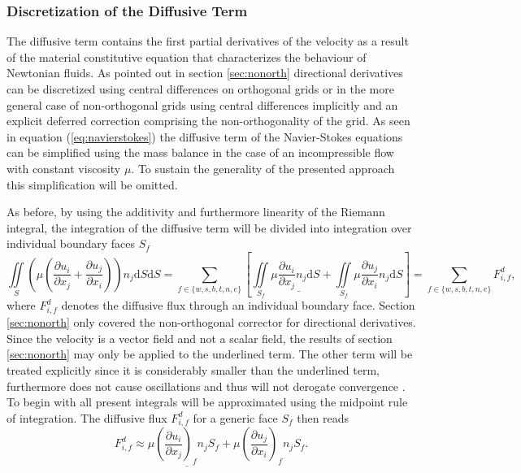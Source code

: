       \subsubsection{Discretization of the Diffusive Term}

      The diffusive term contains the first partial derivatives of the velocity as a result of the material constitutive equation that characterizes the behaviour of Newtonian fluids. As pointed out in section \ref{sec:nonorth} directional derivatives can be discretized using central differences on orthogonal grids or in the more general case of non-orthogonal grids using central differences implicitly and an explicit deferred correction comprising the non-orthogonality of the grid. As seen in equation (\ref{eq:navierstokes}) the diffusive term of the Navier-Stokes equations can be simplified using the mass balance in the case of an incompressible flow with constant viscosity \(\mu\). To sustain the generality of the presented approach this simplification will be omitted.

      As before, by using the additivity and furthermore linearity of the Riemann integral, the integration of the diffusive term will be divided into integration over individual boundary faces \(S_f\) 
      \begin{displaymath}
      \iint\limits_S \left(\mu \left( \frac{\partial u_i}{\partial x_j} + \frac{\partial u_j}{\partial x_i}\right)\right)n_j \mathrm{d}S \mathrm{d}S
      = \sum_{f \in \{w,s,b,t,n,e\}} \left[
        \iint\limits_{S_f} \mu \underline{\frac{\partial u_i}{\partial x_j}n_j \mathrm{d}S}
    + \iint\limits_{S_f} \mu \frac{\partial u_j}{\partial x_i}n_j \mathrm{d}S \right]
       = \sum_{f \in \{w,s,b,t,n,e\}} F_{i,f}^{d},
      \end{displaymath}
      where \(F_{i,f}^{d}\) denotes the diffusive flux through an individual boundary face. Section \ref{sec:nonorth} only covered the non-orthogonal corrector for directional derivatives. Since the velocity is a vector field and not a scalar field, the results of section \ref{sec:nonorth} may only be applied to the underlined term. The other term will be treated explicitly since it is considerably smaller than the underlined term, furthermore does not cause oscillations and thus will not derogate convergence \cite{ferziger02}. To begin with all present integrals will be approximated using the midpoint rule of integration. The diffusive flux \(F_{i,f}^d\) for a generic face \(S_f\) then reads 
      \begin{displaymath}
        F_{i,f}^d \approx \mu \underline{\left(\frac{\partial u_i}{\partial x_j}\right)_f n_j S_f} + \mu \left(\frac{\partial u_j}{\partial x_i}\right)_f n_j S_f.
      \end{displaymath}

